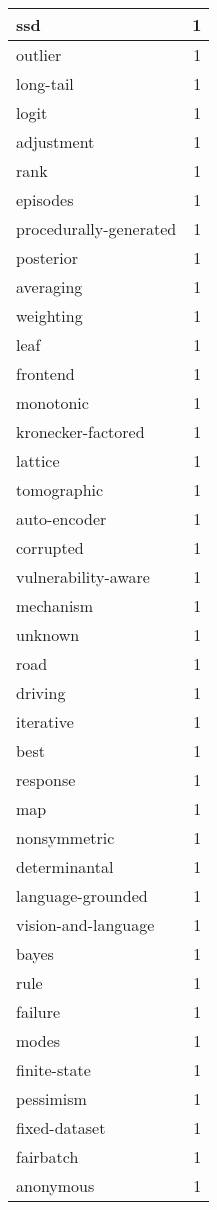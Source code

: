 \begin{table}[h]
\begin{tabular}{|l|r|}
\hline
ssd & 1 \\
\hline
outlier & 1 \\
\hline
long-tail & 1 \\
\hline
logit & 1 \\
\hline
adjustment & 1 \\
\hline
rank & 1 \\
\hline
episodes & 1 \\
\hline
procedurally-generated & 1 \\
\hline
posterior & 1 \\
\hline
averaging & 1 \\
\hline
weighting & 1 \\
\hline
leaf & 1 \\
\hline
frontend & 1 \\
\hline
monotonic & 1 \\
\hline
kronecker-factored & 1 \\
\hline
lattice & 1 \\
\hline
tomographic & 1 \\
\hline
auto-encoder & 1 \\
\hline
corrupted & 1 \\
\hline
vulnerability-aware & 1 \\
\hline
mechanism & 1 \\
\hline
unknown & 1 \\
\hline
road & 1 \\
\hline
driving & 1 \\
\hline
iterative & 1 \\
\hline
best & 1 \\
\hline
response & 1 \\
\hline
map & 1 \\
\hline
nonsymmetric & 1 \\
\hline
determinantal & 1 \\
\hline
language-grounded & 1 \\
\hline
vision-and-language & 1 \\
\hline
bayes & 1 \\
\hline
rule & 1 \\
\hline
failure & 1 \\
\hline
modes & 1 \\
\hline
finite-state & 1 \\
\hline
pessimism & 1 \\
\hline
fixed-dataset & 1 \\
\hline
fairbatch & 1 \\
\hline
anonymous & 1 \\

\end{tabular}
\end{table}
